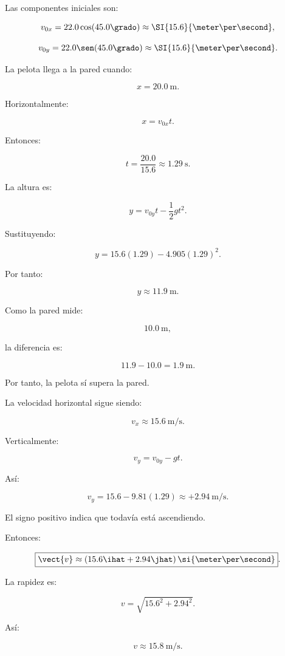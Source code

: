 \begin{explicacion}
Las componentes iniciales son:

\[
v_{0x}
=
22.0\cos(45.0\grado)
\approx
\SI{15.6}{\meter\per\second},
\]

\[
v_{0y}
=
22.0\sen(45.0\grado)
\approx
\SI{15.6}{\meter\per\second}.
\]

La pelota llega a la pared cuando:

\[
x=\SI{20.0}{\meter}.
\]

Horizontalmente:

\[
x=v_{0x}t.
\]

Entonces:

\[
t
=
\frac{20.0}{15.6}
\approx
\SI{1.29}{\second}.
\]

La altura es:

\[
y
=
v_{0y}t-\frac{1}{2}gt^2.
\]

Sustituyendo:

\[
y
=
15.6(1.29)
-
4.905(1.29)^2.
\]

Por tanto:

\[
\boxed{
y\approx\SI{11.9}{\meter}
}.
\]

Como la pared mide:

\[
\SI{10.0}{\meter},
\]

la diferencia es:

\[
11.9-10.0
=
\SI{1.9}{\meter}.
\]

Por tanto, la pelota sí supera la pared.

La velocidad horizontal sigue siendo:

\[
v_x\approx\SI{15.6}{\meter\per\second}.
\]

Verticalmente:

\[
v_y
=
v_{0y}-gt.
\]

Así:

\[
v_y
=
15.6-9.81(1.29)
\approx
+\SI{2.94}{\meter\per\second}.
\]

El signo positivo indica que todavía está ascendiendo.

Entonces:

\[
\boxed{
\vect{v}
\approx
(15.6\ihat+2.94\jhat)
\,\si{\meter\per\second}
}.
\]

La rapidez es:

\[
v
=
\sqrt{
15.6^2+2.94^2
}.
\]

Así:

\[
\boxed{
v\approx\SI{15.8}{\meter\per\second}
}.
\]
\end{explicacion}


